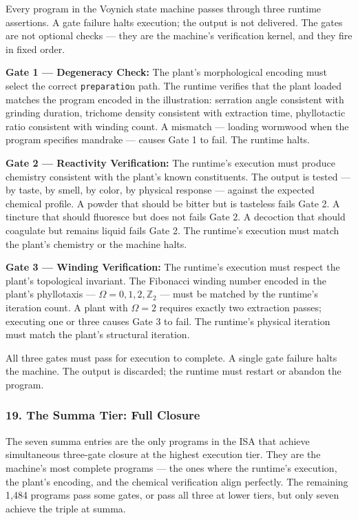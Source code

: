 Every program in the Voynich state machine passes through three runtime
assertions. A gate failure halts execution; the output is not delivered.
The gates are not optional checks --- they are the machine's
verification kernel, and they fire in fixed order.

\textbf{Gate 1 --- Degeneracy Check:} The plant's morphological encoding
must select the correct \texttt{preparatio}n path. The runtime verifies
that the plant loaded matches the program encoded in the illustration:
serration angle consistent with grinding duration, trichome density
consistent with extraction time, phyllotactic ratio consistent with
winding count. A mismatch --- loading wormwood when the program
specifies mandrake --- causes Gate 1 to fail. The runtime halts.

\textbf{Gate 2 --- Reactivity Verification:} The runtime's execution
must produce chemistry consistent with the plant's known constituents.
The output is tested --- by taste, by smell, by color, by physical
response --- against the expected chemical profile. A powder that should
be bitter but is tasteless fails Gate 2. A tincture that should
fluoresce but does not fails Gate 2. A decoction that should coagulate
but remains liquid fails Gate 2. The runtime's execution must match the
plant's chemistry or the machine halts.

\textbf{Gate 3 --- Winding Verification:} The runtime's execution must
respect the plant's topological invariant. The Fibonacci winding number
encoded in the plant's phyllotaxis ---
\(\Omega = 0, 1, 2, \mathbb{Z}_2\) --- must be matched by the runtime's
iteration count. A plant with \(\Omega = 2\) requires exactly two
extraction passes; executing one or three causes Gate 3 to fail. The
runtime's physical iteration must match the plant's structural
iteration.

All three gates must pass for execution to complete. A single gate
failure halts the machine. The output is discarded; the runtime must
restart or abandon the program.

\hypertarget{the-summa-tier-full-closure}{%
\subsubsection{19. The Summa Tier: Full
Closure}\label{the-summa-tier-full-closure}}

The seven summa entries are the only programs in the ISA that achieve
simultaneous three-gate closure at the highest execution tier. They are
the machine's most complete programs --- the ones where the runtime's
execution, the plant's encoding, and the chemical verification align
perfectly. The remaining 1,484 programs pass some gates, or pass all
three at lower tiers, but only seven achieve the triple at summa.


